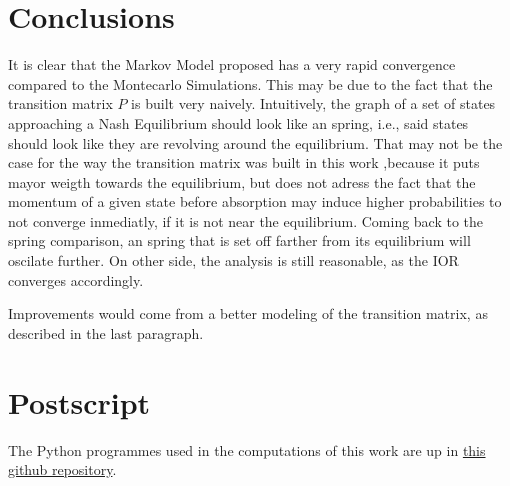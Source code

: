 \documentclass{article}
\begin{document}
\section{Conclusions}
It is clear that the Markov Model proposed has a very rapid convergence compared to the Montecarlo Simulations. This may be due to the fact that the transition matrix $P$ is built very naively. Intuitively, the graph of a set of states approaching a Nash Equilibrium should look like an spring, i.e., said states should look like they are revolving around the equilibrium. That may not be the case for the way the transition matrix was built in this work ,because it puts mayor weigth towards the equilibrium, but does not adress the fact that the momentum of a given state before absorption may induce higher probabilities to not converge inmediatly, if it is not near the equilibrium. Coming back to the spring comparison, an spring that is set off farther from its equilibrium will oscilate further. On other side, the analysis is still reasonable, as the IOR converges accordingly.\par
Improvements would come from a better modeling of the transition matrix, as described in the last paragraph.\par 

\section{Postscript}
The Python programmes used in the computations of this work are up in \href{https://github.com/NeutralElement/Stochastic-Processes-Project}{this github repository}.

\newpage







\end{document}
